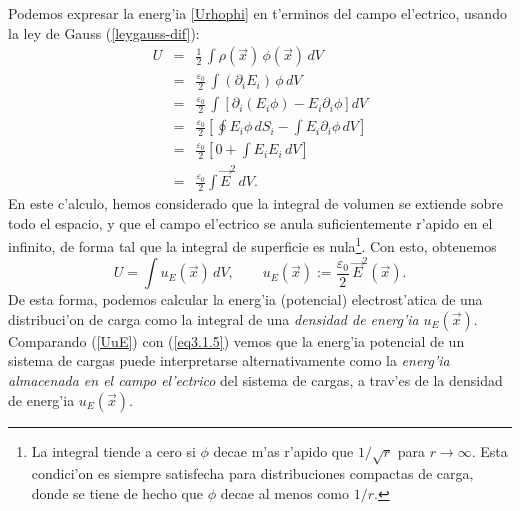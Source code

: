 Podemos expresar la energ'ia \eqref{Urhophi} en t'erminos del campo el'ectrico,
usando la ley de Gauss (\ref{leygauss-dif}):
\begin{eqnarray}
U&=&\frac{1}{2}\,\int\rho(\vec{x})\,\phi(\vec{x})\,dV \\
&=&\frac{\varepsilon_0}{2}\,\int(\partial_i E_i)\,\phi\,dV\\
&=&\frac{\varepsilon_0}{2}\,\int\left[
\partial_i(E_i\phi)-E_i\partial_i\phi\right] dV\\
&=&\frac{\varepsilon_0}{2}\left[\oint
E_i\phi\,dS_i-\int E_i\partial_i\phi\, dV\right]\\
&=&\frac{\varepsilon_0}{2}\left[0+\int E_iE_i\, dV\right]\\
&=&\frac{\varepsilon_0}{2}\int \vec{E}^2\, dV.
\end{eqnarray}
En este c'alculo, hemos considerado que la integral de volumen se extiende sobre
todo el espacio, y que el campo el'ectrico se anula suficientemente r'apido en
el infinito, de forma tal que la integral de superficie es nula\footnote{La integral tiende a cero si $\phi$ decae m'as r'apido que $1/\sqrt{r}$ para $r\to\infty$. Esta condici'on es siempre satisfecha para distribuciones compactas de carga, donde se tiene de hecho que $\phi$ decae al menos como $1/r$.}. Con esto,
obtenemos
\begin{equation} \label{UuE}
\boxed{U=\int u_E(\vec{x})\,dV, \qquad u_E(\vec{x}):=\frac{\varepsilon_0}{2}\,
\vec{E}^2(\vec{x}) .}
\end{equation}
De esta forma, podemos calcular la energ'ia (potencial) electrost'atica de una
distribuci'on de carga como la integral de una \textit{densidad de energ'ia}
$u_E(\vec{x})$. Comparando (\ref{UuE}) con (\ref{eq3.1.5}) vemos que la
energ'ia potencial de un sistema de cargas puede interpretarse alternativamente
como la \textit{energ'ia almacenada en el campo el'ectrico} del sistema de
cargas, a trav'es de la densidad de energ'ia $u_E(\vec{x})$.

